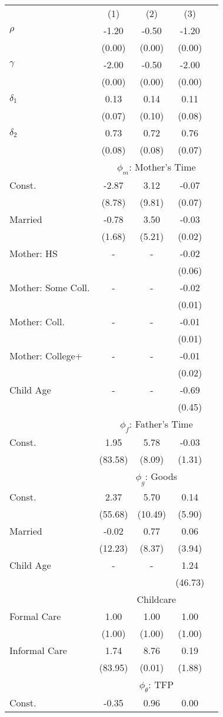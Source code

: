 \begin{tabular}{lcccc}\\\toprule
&(1)&(2)&(3)&\\\cmidrule(r){2-5}$\rho$&-1.20&-0.50&-1.20&\\
&(0.00)&(0.00)&(0.00)&\\
$\gamma$&-2.00&-0.50&-2.00&\\
&(0.00)&(0.00)&(0.00)&\\
$\delta_{1}$&0.13&0.14&0.11&\\
&(0.07)&(0.10)&(0.08)&\\
$\delta_{2}$&0.73&0.72&0.76&\\
&(0.08)&(0.08)&(0.07)&\\
& \multicolumn{4}{c}{$\phi_{m}$: Mother's Time}\\\cmidrule(r){2-5}Const.&-2.87&3.12&-0.07&\\
&(8.78)&(9.81)&(0.07)&\\
Married&-0.78&3.50&-0.03&\\&(1.68)&(5.21)&(0.02)&\\Mother: HS&-&-&-0.02&\\&&&(0.06)&\\Mother: Some Coll.&-&-&-0.02&\\&&&(0.01)&\\Mother: Coll.&-&-&-0.01&\\&&&(0.01)&\\Mother: College+&-&-&-0.01&\\&&&(0.02)&\\Child Age&-&-&-0.69&\\&&&(0.45)&\\& \multicolumn{4}{c}{$\phi_{f}$: Father's Time}\\\cmidrule(r){2-5}Const.&1.95&5.78&-0.03&\\
&(83.58)&(8.09)&(1.31)&\\
& \multicolumn{4}{c}{$\phi_{g}$: Goods}\\\cmidrule(r){2-5}Const.&2.37&5.70&0.14&\\
&(55.68)&(10.49)&(5.90)&\\
Married&-0.02&0.77&0.06&\\&(12.23)&(8.37)&(3.94)&\\Child Age&-&-&1.24&\\&&&(46.73)&\\& \multicolumn{4}{c}{Childcare}\\\cmidrule(r){2-5}Formal Care&1.00&1.00&1.00&\\&(1.00)&(1.00)&(1.00)&\\Informal Care&1.74&8.76&0.19&\\&(83.95)&(0.01)&(1.88)&\\& \multicolumn{4}{c}{$\phi_{\theta}$: TFP}\\\cmidrule(r){2-5}Const.&-0.35&0.96&0.00&\\

\end{tabular}
